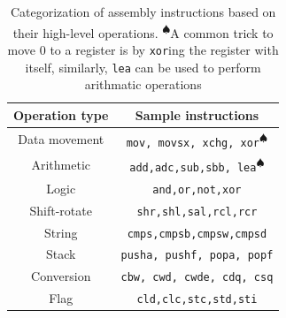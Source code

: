 \begin{table}[t]
\caption{Categorization of assembly instructions based on their high-level operations. \textsuperscript{$\spadesuit$}A common trick to move 0 to a register is by \texttt{xor}ing the register with itself, similarly, \texttt{lea} can be used to perform arithmatic operations}\label{tab:opt-cat}
\begin{center}
{\scriptsize
\begin{tabular}{|c|c|}
  \hline
  \textbf{Operation type} & \textbf{Sample instructions} \\
  \hline
  Data movement & \texttt{mov, movsx, xchg, xor\textsuperscript{$\spadesuit$}}\\
  \hline
  Arithmetic  & \texttt{add,adc,sub,sbb, lea\textsuperscript{$\spadesuit$}} \\
  \hline
  Logic & \texttt{and,or,not,xor}\\
  \hline
  Shift-rotate & \texttt{shr,shl,sal,rcl,rcr}\\
  \hline
  String  & \texttt{cmps,cmpsb,cmpsw,cmpsd} \\
  \hline
  Stack  & \texttt{pusha, pushf, popa, popf} \\
  \hline
  Conversion & \texttt{cbw, cwd, cwde, cdq, csq}\\
  \hline
 Flag  & \texttt{cld,clc,stc,std,sti} \\
  \hline
  \end{tabular}
}
\end{center}
\end{table}


